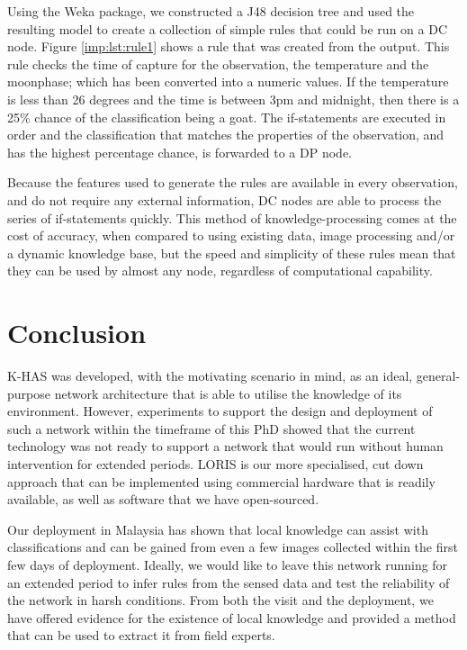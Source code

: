 			Using the Weka package, we constructed a J48 decision tree and used the resulting model to create a collection of simple rules that could be run on a DC node. Figure \ref{imp:lst:rule1} shows a rule that was created from the output. This rule checks the time of capture for the observation, the temperature and the moonphase; which has been converted into a numeric values. If the temperature is less than 26 degrees and the time is between 3pm and midnight, then there is a 25\% chance of the classification being a goat. The if-statements are executed in order and the classification that matches the properties of the observation, and has the highest percentage chance, is forwarded to a DP node.
            
            Because the features used to generate the rules are available in every observation, and do not require any external information, DC nodes are able to process the series of if-statements quickly. This method of knowledge-processing comes at the cost of accuracy, when compared to using existing data, image processing and/or a dynamic knowledge base, but the speed and simplicity of these rules mean that they can be used by almost any node, regardless of computational capability.

		
	\section{Conclusion}\label{loris:conc}
	 K-HAS was developed, with the motivating scenario in mind, as an ideal, general-purpose network architecture that is able to utilise the knowledge of its environment. However, experiments to support the design and deployment of such a network within the timeframe of this PhD showed that the current technology was not ready to support a network that would run without human intervention for extended periods. LORIS is our more specialised, cut down approach that can be implemented using commercial hardware that is readily available, as well as software that we have open-sourced. 
	
	Our deployment in Malaysia has shown that local knowledge can assist with classifications and can be gained from even a few images collected within the first few days of deployment. Ideally, we would like to leave this network running for an extended period to infer rules from the sensed data and test the reliability of the network in harsh conditions. From both the visit and the deployment, we have offered evidence for the existence of local knowledge and provided a method that can be used to extract it from field experts. 
    
